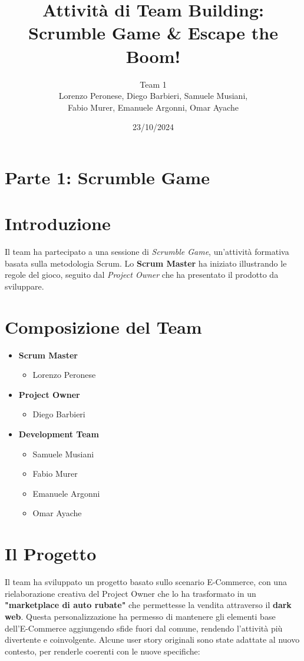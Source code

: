 \documentclass{article}
\title{\textbf{Attività di Team Building:\\Scrumble Game \& Escape the Boom!}}
\author{Team 1\\
Lorenzo Peronese, Diego Barbieri, Samuele Musiani,\\
Fabio Murer, Emanuele Argonni, Omar Ayache}
\date{23/10/2024}
\begin{document}
\maketitle

\section*{Parte 1: Scrumble Game}

\section*{Introduzione}
Il team ha partecipato a una sessione di \textit{Scrumble Game}, un'attività 
formativa basata sulla metodologia Scrum. Lo \textbf{Scrum Master} ha iniziato 
illustrando le regole del gioco, seguito dal \textit{Project Owner} che ha 
presentato il prodotto da sviluppare.

\section*{Composizione del Team}
\begin{itemize}
    \item \textbf{Scrum Master}
    \begin{itemize}
        \item Lorenzo Peronese
    \end{itemize}
    \item \textbf{Project Owner}
    \begin{itemize}
        \item Diego Barbieri
    \end{itemize}
    \item \textbf{Development Team}
    \begin{itemize}
        \item Samuele Musiani
        \item Fabio Murer
        \item Emanuele Argonni
        \item Omar Ayache
    \end{itemize}
\end{itemize}

\section*{Il Progetto}
Il team ha sviluppato un progetto basato sullo scenario E-Commerce, con una 
rielaborazione creativa del Project Owner che lo ha trasformato in un 
\textbf{"marketplace di auto rubate"} che permettesse la vendita attraverso il 
\textbf{dark web}. Questa personalizzazione ha permesso di mantenere gli elementi 
base dell'E-Commerce aggiungendo sfide fuori dal comune, rendendo l'attività più 
divertente e coinvolgente. Alcune user story originali sono state adattate al 
nuovo contesto, per renderle coerenti con le nuove specifiche:
\end{document}
